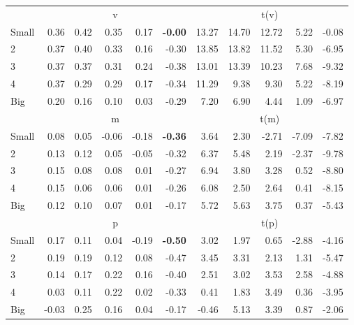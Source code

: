 \begin{tabular}{lrrrrrrrrrr}
  
     & \multicolumn{5}{c}{v} & \multicolumn{5}{c}{t(v)}   \\
     \cmidrule(r){2-6} \cmidrule(r){7-11} 
    Small  & 0.36  & 0.42  & 0.35  & 0.17  & \textbf{-0.00}  & 13.27  & 14.70  & 12.72  & 5.22  & -0.08   \\
    2  & 0.37  & 0.40  & 0.33  & 0.16  & -0.30  & 13.85  & 13.82  & 11.52  & 5.30  & -6.95   \\
    3  & 0.37  & 0.37  & 0.31  & 0.24  & -0.38  & 13.01  & 13.39  & 10.23  & 7.68  & -9.32   \\
    4  & 0.37  & 0.29  & 0.29  & 0.17  & -0.34  & 11.29  & 9.38  & 9.30  & 5.22  & -8.19   \\
    Big  & 0.20  & 0.16  & 0.10  & 0.03  & -0.29  & 7.20  & 6.90  & 4.44  & 1.09  & -6.97   \\
    
  
     & \multicolumn{5}{c}{m} & \multicolumn{5}{c}{t(m)}   \\
     \cmidrule(r){2-6} \cmidrule(r){7-11} 
    Small  & 0.08  & 0.05  & -0.06  & -0.18  & \textbf{-0.36}  & 3.64  & 2.30  & -2.71  & -7.09  & -7.82   \\
    2  & 0.13  & 0.12  & 0.05  & -0.05  & -0.32  & 6.37  & 5.48  & 2.19  & -2.37  & -9.78   \\
    3  & 0.15  & 0.08  & 0.08  & 0.01  & -0.27  & 6.94  & 3.80  & 3.28  & 0.52  & -8.80   \\
    4  & 0.15  & 0.06  & 0.06  & 0.01  & -0.26  & 6.08  & 2.50  & 2.64  & 0.41  & -8.15   \\
    Big  & 0.12  & 0.10  & 0.07  & 0.01  & -0.17  & 5.72  & 5.63  & 3.75  & 0.37  & -5.43   \\
    
  
     & \multicolumn{5}{c}{p} & \multicolumn{5}{c}{t(p)}   \\
     \cmidrule(r){2-6} \cmidrule(r){7-11} 
    Small  & 0.17  & 0.11  & 0.04  & -0.19  & \textbf{-0.50}  & 3.02  & 1.97  & 0.65  & -2.88  & -4.16   \\
    2  & 0.19  & 0.19  & 0.12  & 0.08  & -0.47  & 3.45  & 3.31  & 2.13  & 1.31  & -5.47   \\
    3  & 0.14  & 0.17  & 0.22  & 0.16  & -0.40  & 2.51  & 3.02  & 3.53  & 2.58  & -4.88   \\
    4  & 0.03  & 0.11  & 0.22  & 0.02  & -0.33  & 0.41  & 1.83  & 3.49  & 0.36  & -3.95   \\
    Big  & -0.03  & 0.25  & 0.16  & 0.04  & -0.17  & -0.46  & 5.13  & 3.39  & 0.87  & -2.06   \\


\end{tabular}
